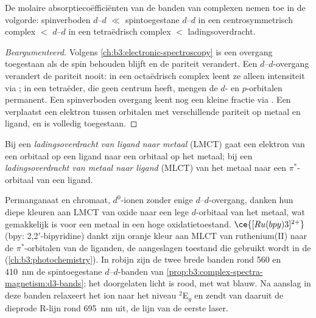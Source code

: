 \begin{proposition}\label{prop:b3:complex-spectra-magnetism:intensity-order}
De molaire absorptiecoëfficiënten van de banden van complexen nemen toe
in de volgorde: spinverboden $d$--$d$ $\ll$ spintoegestane $d$--$d$ in een centrosymmetrisch complex $<$ $d$--$d$
in een tetraëdrisch complex $<$ ladingsoverdracht.
\end{proposition}

\begin{proof}[Beargumenteerd]
Volgens \cref{ch:b3:electronic-spectroscopy} is een overgang toegestaan
als de spin behouden blijft en de pariteit verandert. Een $d$--$d$-overgang verandert de pariteit nooit: in een
octaëdrisch complex leent ze alleen intensiteit via ; in een tetraëder, die geen centrum heeft, mengen de $d$- en
$p$-orbitalen permanent. Een spinverboden overgang leent nog een kleine
fractie via . Een  verplaatst
een elektron tussen orbitalen met verschillende pariteit op metaal en
ligand, en is volledig toegestaan.
\end{proof}

\begin{definition}[Ladingsoverdracht]\label{def:b3:complex-spectra-magnetism:ct}
Bij een \emph{ladingsoverdracht van ligand naar metaal}
(LMCT) gaat een elektron van een orbitaal op een ligand naar een orbitaal
op het metaal; bij een
\emph{ladingsoverdracht van metaal naar ligand}
(MLCT) van het metaal naar een $\pi^*$-orbitaal van een ligand.
\end{definition}

Permanganaat en chromaat, $d^0$-ionen zonder enige $d$--$d$-overgang, danken hun diepe
kleuren aan LMCT van oxide naar een lege $d$-orbitaal van het metaal, wat
gemakkelijk is voor een metaal in een hoge oxidatietoestand. $\ce{[Ru(bpy)3]^{2+}}$ (bpy: 2,2$'$-bipyridine) dankt zijn oranje kleur aan MLCT
van ruthenium(II) naar de $\pi^*$-orbitalen van de liganden, de aangeslagen toestand die gebruikt wordt in
de  (\cref{ch:b3:photochemistry}). In robijn zijn de
twee brede banden
rond 560 en \qty{410}{nm} de spintoegestane $d$--$d$-banden van
\cref{prop:b3:complex-spectra-magnetism:d3-bands}; het doorgelaten licht
is rood, met wat blauw. Na aanslag in deze banden relaxeert het ion naar het niveau $^2$E$_g$ en
zendt van daaruit de dieprode R-lijn rond \qty{695}{nm} uit, de lijn van
de eerste laser.

